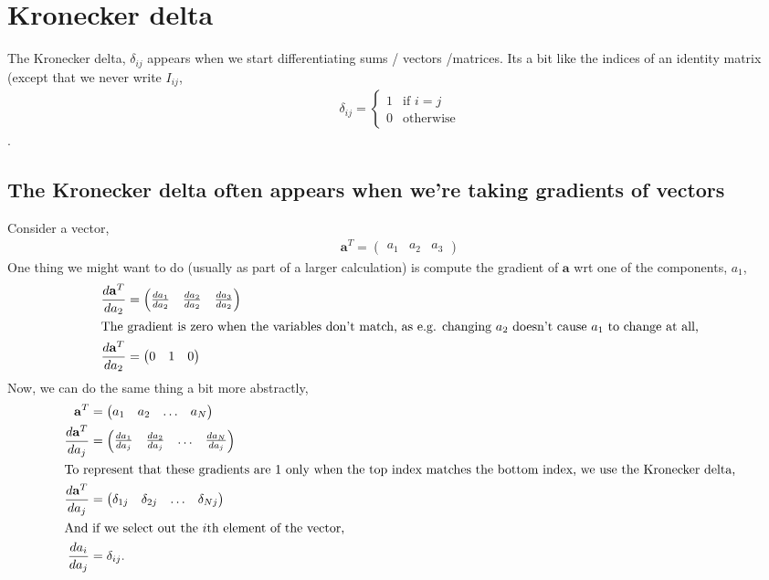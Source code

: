 \documentclass{article}
\newcommand{\dt}[2][]{\frac{d #1}{d #2}}
\renewcommand{\a}{\mathbf{a}}
\begin{document}
\section{Kronecker delta}
The Kronecker delta, $\delta_{ij}$ appears when we start differentiating sums / vectors /matrices.
Its a bit like the indices of an identity matrix (except that we never write $I_{ij}$,
\begin{align}
  \delta_{ij} = \begin{cases}
    1 & \text{if } i=j\\
    0 & \text{otherwise}
  \end{cases}
\end{align}.

\subsection{The Kronecker delta often appears when we're taking gradients of vectors}
Consider a vector,
\begin{align}
  \a^T = \begin{pmatrix}
    a_1 & a_2 & a_3
  \end{pmatrix}
\end{align}
One thing we might want to do (usually as part of a larger calculation) is compute the gradient of $\a$ wrt one of the components, $a_1$,
\begin{align}
  \dt[\a^T]{a_2} &= \begin{pmatrix}
    \dt[a_1]{a_2} & \dt[a_2]{a_2} & \dt[a_3]{a_2}
  \end{pmatrix}\\
  \intertext{The gradient is zero when the variables don't match, as e.g. changing $a_2$ doesn't cause $a_1$ to change at all,}
  \dt[\a^T]{a_2} &= \begin{pmatrix}
    0 & 1 & 0
  \end{pmatrix}
\end{align}
Now, we can do the same thing a bit more abstractly,
\begin{align}
  \a^T &= \begin{pmatrix}
    a_1 & a_2 & \hdots & a_N
  \end{pmatrix}\\
  \dt[\a^T]{a_j} &= \begin{pmatrix}
    \dt[a_1]{a_j} & \dt[a_2]{a_j} & \hdots & \dt[a_N]{a_j}
  \end{pmatrix}\\
  \intertext{To represent that these gradients are $1$ only when the top index matches the bottom index, we use the Kronecker delta,}
  \dt[\a^T]{a_j} &= \begin{pmatrix}
    \delta_{1j} & \delta_{2j} & \hdots & \delta_{Nj}
  \end{pmatrix}\\
  \intertext{And if we select out the $i$th element of the vector,}
  \dt[a_i]{a_j} &= \delta_{ij}.
\end{align}
\end{document}
